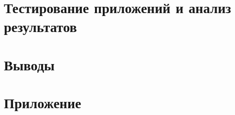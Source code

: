 \section{Тестирование приложений и анализ результатов}


\section{Выводы}


\newpage

\section*{Приложение}



